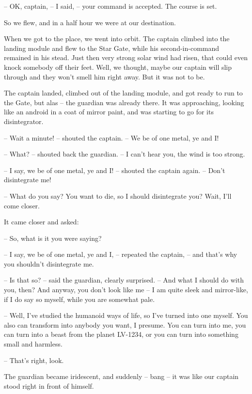 \documentclass[ebook,oneside,final,openright]{memoir}
\begin{document}
– OK, captain, – I said, – your command is accepted. The course is set.\par
So we flew, and in a half hour we were at our destination.\par
\par
When we got to the place, we went into orbit. The captain climbed into the landing module and flew to the Star Gate, while his second-in-command remained in his stead. Just then very strong solar wind had risen, that could even knock somebody off their feet. Well, we thought, maybe our captain will slip through and they won’t smell him right away. But it was not to be.\par
\par
The captain landed, climbed out of the landing module, and got ready to run to the Gate, but alas – the guardian was already there. It was approaching, looking like an android in a coat of mirror paint, and was starting to go for its disintegrator.\par
– Wait a minute! – shouted the captain. – We be of one metal, ye and I!\par
– What? – shouted back the guardian. – I can’t hear you, the wind is too strong.\par
– I say, we be of one metal, ye and I! – shouted the captain again. – Don’t disintegrate me!\par
– What do you say? You want to die, so I should disintegrate you? Wait, I’ll come closer.\par
\par
It came closer and asked:\par
– So, what is it you were saying?\par
– I say, we be of one metal, ye and I, – repeated the captain, – and that’s why you shouldn’t disintegrate me.\par
– Is that so? – said the guardian, clearly surprised. – And what I should do with you, then? And anyway, you don’t look like me – I am quite sleek and mirror-like, if I do say so myself, while you are somewhat pale.\par
– Well, I’ve studied the humanoid ways of life, so I’ve turned into one myself. You also can transform into anybody you want, I presume. You can turn into me, you can turn into a beast from the planet LV-1234, or you can turn into something small and harmless.\par
– That’s right, look.\par
\par
The guardian became iridescent, and suddenly – bang – it was like our captain stood right in front of himself.\par
\end{document}
